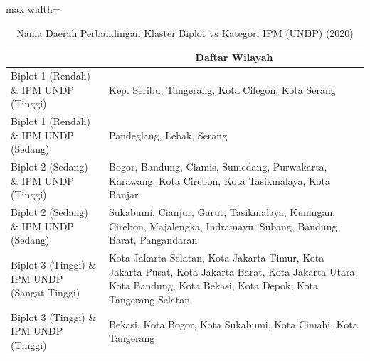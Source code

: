 \begin{table}[H]
\centering
\caption{Nama Daerah Perbandingan Klaster Biplot vs Kategori IPM (UNDP) (2020)} \label{tab:app1crossname2020}
\begin{adjustbox}{max width=\textwidth}
\begin{tabular}{|>{\centering\arraybackslash}p{4cm}|p{10cm}|}
\hline
\multicolumn{1}{|c|}{\textbf{Kategori}} & \multicolumn{1}{c|}{\textbf{Daftar Wilayah}} \\
\hline
Biplot 1 (Rendah) \& IPM UNDP (Tinggi) & Kep. Seribu, Tangerang, Kota Cilegon, Kota Serang \\
\hline
Biplot 1 (Rendah) \& IPM UNDP (Sedang) & Pandeglang, Lebak, Serang \\
\hline
Biplot 2 (Sedang) \& IPM UNDP (Tinggi) & Bogor, Bandung, Ciamis, Sumedang, Purwakarta, Karawang, Kota Cirebon, Kota Tasikmalaya, Kota Banjar \\
\hline
Biplot 2 (Sedang) \& IPM UNDP (Sedang) & Sukabumi, Cianjur, Garut, Tasikmalaya, Kuningan, Cirebon, Majalengka, Indramayu, Subang, Bandung Barat, Pangandaran \\
\hline
Biplot 3 (Tinggi) \& IPM UNDP (Sangat Tinggi) & Kota Jakarta Selatan, Kota Jakarta Timur, Kota Jakarta Pusat, Kota Jakarta Barat, Kota Jakarta Utara, Kota Bandung, Kota Bekasi, Kota Depok, Kota Tangerang Selatan \\
\hline
Biplot 3 (Tinggi) \& IPM UNDP (Tinggi) & Bekasi, Kota Bogor, Kota Sukabumi, Kota Cimahi, Kota Tangerang \\
\hline
\end{tabular}
\end{adjustbox}
\end{table}